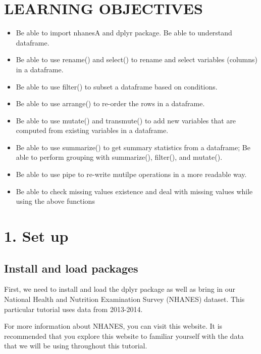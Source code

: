 \documentclass[
]{book}
\providecommand{\tightlist}{%
  \setlength{\itemsep}{0pt}\setlength{\parskip}{0pt}}
\begin{document}
\hypertarget{learning-objectives-4}{%
\section{LEARNING OBJECTIVES}\label{learning-objectives-4}}

\begin{itemize}
\tightlist
\item
  Be able to import nhanesA and dplyr package. Be able to understand dataframe.
\item
  Be able to use rename() and select() to rename and select variables (columns) in a dataframe.
\item
  Be able to use filter() to subset a dataframe based on conditions.
\item
  Be able to use arrange() to re-order the rows in a dataframe.
\item
  Be able to use mutate() and transmute() to add new variables that are computed from existing variables in a dataframe.
\item
  Be able to use summarize() to get summary statistics from a dataframe; Be able to perform grouping with summarize(), filter(), and mutate().
\item
  Be able to use pipe to re-write mutilpe operations in a more readable way.
\item
  Be able to check missing values existence and deal with missing values while using the above functions
\end{itemize}

\hypertarget{set-up-1}{%
\section{1. Set up}\label{set-up-1}}

\hypertarget{install-and-load-packages}{%
\subsection{Install and load packages}\label{install-and-load-packages}}

First, we need to install and load the dplyr package as well as bring in our National Health and Nutrition Examination Survey (NHANES) dataset. This particular tutorial uses data from 2013-2014.

For more information about NHANES, you can visit this website. It is recommended that you explore this website to familiar yourself with the data that we will be using throughout this tutorial.
\end{document}
